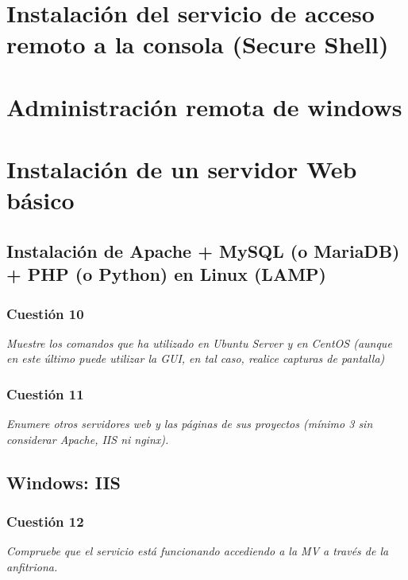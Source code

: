 \section{Instalación del servicio de acceso remoto a la consola (Secure Shell)}


\section{Administración remota de windows}


\section{Instalación de un servidor Web básico}

\subsection{Instalación de Apache + MySQL (o MariaDB) + PHP (o Python) en Linux (LAMP)}
\subsubsection{Cuestión 10}
\textit{Muestre los comandos que ha utilizado en Ubuntu Server y en CentOS (aunque en este último puede utilizar la GUI, en tal caso, realice capturas de pantalla)}

\subsubsection{Cuestión 11}
\textit{Enumere otros servidores web y las páginas de sus proyectos (mínimo 3 sin considerar Apache, IIS ni nginx).}


\subsection{Windows: IIS}
\subsubsection{Cuestión 12}
\textit{Compruebe que el servicio está funcionando accediendo a la MV a través de la anfitriona.}


